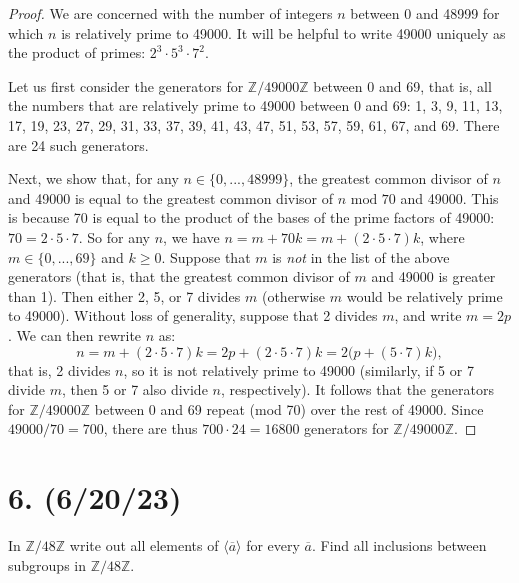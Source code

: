\documentclass{article}
\begin{document}
\begin{proof}
    We are concerned with the number of integers $n$ between 0 and 48999 for which $n$ is relatively prime to 49000. It will be helpful to write 49000 uniquely as the product of primes: $2^3 \cdot 5^3 \cdot 7^2$.

    Let us first consider the generators for $\mathbb{Z}/49000\mathbb{Z}$ between 0 and 69, that is, all the numbers that are relatively prime to 49000 between 0 and 69: 1, 3, 9, 11, 13, 17, 19, 23, 27, 29, 31, 33, 37, 39, 41, 43, 47, 51, 53, 57, 59, 61, 67, and 69. There are 24 such generators.

    Next, we show that, for any $n \in \{0, ..., 48999\}$, the greatest common divisor of $n$ and 49000 is equal to the greatest common divisor of $n \text{ mod } 70$ and 49000. This is because 70 is equal to the product of the bases of the prime factors of 49000: $70 = 2 \cdot 5 \cdot 7$. So for any $n$, we have $n = m + 70k = m + (2 \cdot 5 \cdot 7)k$, where $m \in \{0, ..., 69\}$ and $k \geq 0$. Suppose that $m$ is \emph{not} in the list of the above generators (that is, that the greatest common divisor of $m$ and 49000 is greater than 1). Then either 2, 5, or 7 divides $m$ (otherwise $m$ would be relatively prime to 49000). Without loss of generality, suppose that 2 divides $m$, and write $m = 2p$. We can then rewrite $n$ as:
    \begin{equation*}
        n = m + (2 \cdot 5 \cdot 7)k = 2p + (2 \cdot 5 \cdot 7)k = 2 \bigl( p + (5 \cdot 7)k \bigr),
    \end{equation*}
    that is, 2 divides $n$, so it is not relatively prime to 49000 (similarly, if 5 or 7 divide $m$, then 5 or 7 also divide $n$, respectively). It follows that the generators for $\mathbb{Z}/49000\mathbb{Z}$ between 0 and 69 repeat (mod 70) over the rest of 49000. Since $49000/70 = 700$, there are thus $700 \cdot 24 = 16800$ generators for $\mathbb{Z}/49000\mathbb{Z}$.
\end{proof}

\section*{6. (6/20/23)}

In $\mathbb{Z}/48\mathbb{Z}$ write out all elements of $\langle \overline{a} \rangle$ for every $\overline{a}$. Find all inclusions between subgroups in $\mathbb{Z}/48\mathbb{Z}$.
\end{document}
